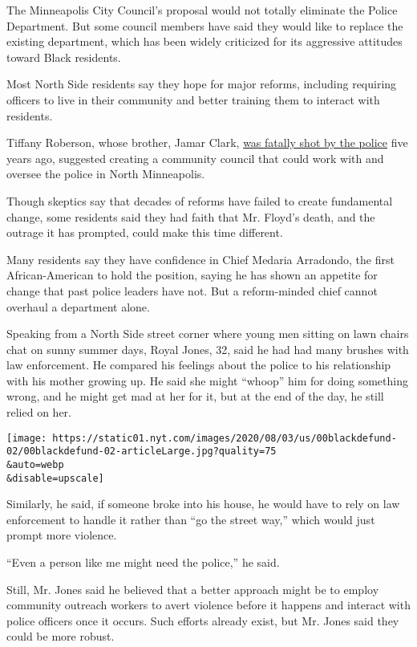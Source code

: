 The Minneapolis City Council's proposal would not totally eliminate the
Police Department. But some council members have said they would like to
replace the existing department, which has been widely criticized for
its aggressive attitudes toward Black residents.

Most North Side residents say they hope for major reforms, including
requiring officers to live in their community and better training them
to interact with residents.

Tiffany Roberson, whose brother, Jamar Clark,
\href{https://www.nytimes.com/2016/03/31/us/jamar-clark-shooting-minneapolis.html}{was
fatally shot by the police} five years ago, suggested creating a
community council that could work with and oversee the police in North
Minneapolis.

Though skeptics say that decades of reforms have failed to create
fundamental change, some residents said they had faith that Mr. Floyd's
death, and the outrage it has prompted, could make this time different.

Many residents say they have confidence in Chief Medaria Arradondo, the
first African-American to hold the position, saying he has shown an
appetite for change that past police leaders have not. But a
reform-minded chief cannot overhaul a department alone.

Speaking from a North Side street corner where young men sitting on lawn
chairs chat on sunny summer days, Royal Jones, 32, said he had had many
brushes with law enforcement. He compared his feelings about the police
to his relationship with his mother growing up. He said she might
``whoop'' him for doing something wrong, and he might get mad at her for
it, but at the end of the day, he still relied on her.

\texttt{[image: https://static01.nyt.com/images/2020/08/03/us/00blackdefund-02/00blackdefund-02-articleLarge.jpg?quality=75\\\&auto=webp\\\&disable=upscale]}

Similarly, he said, if someone broke into his house, he would have to
rely on law enforcement to handle it rather than ``go the street way,''
which would just prompt more violence.

``Even a person like me might need the police,'' he said.

Still, Mr. Jones said he believed that a better approach might be to
employ community outreach workers to avert violence before it happens
and interact with police officers once it occurs. Such efforts already
exist, but Mr. Jones said they could be more robust.

